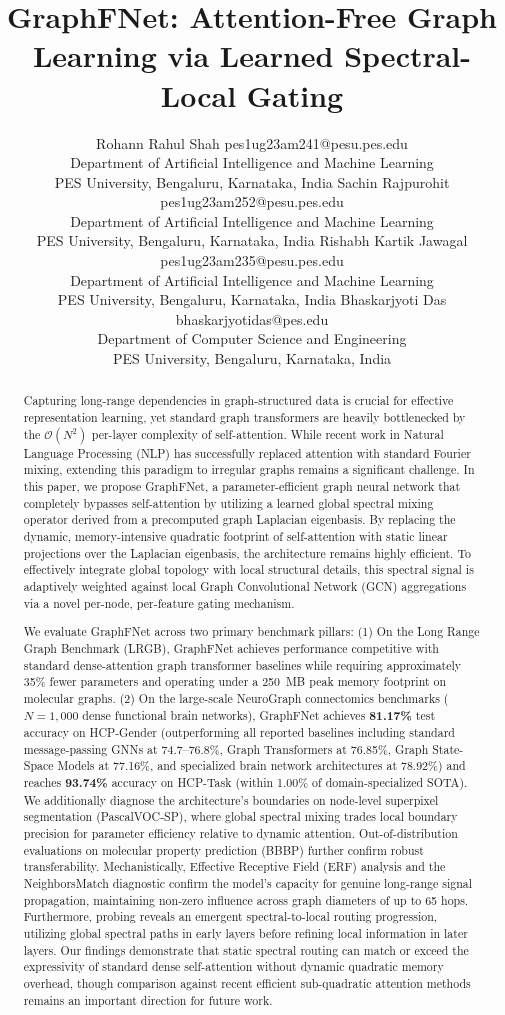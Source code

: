 \documentclass[10pt]{article}
\title{GraphFNet: Attention-Free Graph Learning via Learned Spectral-Local Gating}
\author{\name Rohann Rahul Shah \email pes1ug23am241@pesu.pes.edu \\
      \addr Department of Artificial Intelligence and Machine Learning \\
      PES University, Bengaluru, Karnataka, India
      \AND
      \name Sachin Rajpurohit \email pes1ug23am252@pesu.pes.edu \\
      \addr Department of Artificial Intelligence and Machine Learning \\
      PES University, Bengaluru, Karnataka, India
      \AND
      \name Rishabh Kartik Jawagal \email pes1ug23am235@pesu.pes.edu \\
      \addr Department of Artificial Intelligence and Machine Learning \\
      PES University, Bengaluru, Karnataka, India
      \AND
      \name Bhaskarjyoti Das \email bhaskarjyotidas@pes.edu \\
      \addr Department of Computer Science and Engineering \\
      PES University, Bengaluru, Karnataka, India}
\begin{document}
\maketitle

\begin{abstract}
Capturing long-range dependencies in graph-structured data is crucial for effective representation learning, yet standard graph transformers are heavily bottlenecked by the $\mathcal{O}(N^2)$ per-layer complexity of self-attention. While recent work in Natural Language Processing (NLP) has successfully replaced attention with standard Fourier mixing, extending this paradigm to irregular graphs remains a significant challenge. In this paper, we propose GraphFNet, a parameter-efficient graph neural network that completely bypasses self-attention by utilizing a learned global spectral mixing operator derived from a precomputed graph Laplacian eigenbasis. By replacing the dynamic, memory-intensive quadratic footprint of self-attention with static linear projections over the Laplacian eigenbasis, the architecture remains highly efficient. To effectively integrate global topology with local structural details, this spectral signal is adaptively weighted against local Graph Convolutional Network (GCN) aggregations via a novel per-node, per-feature gating mechanism.

We evaluate GraphFNet across two primary benchmark pillars: (1) On the Long Range Graph Benchmark (LRGB), GraphFNet achieves performance competitive with standard dense-attention graph transformer baselines while requiring approximately 35\% fewer parameters and operating under a 250~MB peak memory footprint on molecular graphs. (2) On the large-scale NeuroGraph connectomics benchmarks ($N=1,000$ dense functional brain networks), GraphFNet achieves \textbf{81.17\%} test accuracy on HCP-Gender (outperforming all reported baselines including standard message-passing GNNs at 74.7--76.8\%, Graph Transformers at 76.85\%, Graph State-Space Models at 77.16\%, and specialized brain network architectures at 78.92\%) and reaches \textbf{93.74\%} accuracy on HCP-Task (within 1.00\% of domain-specialized SOTA). We additionally diagnose the architecture's boundaries on node-level superpixel segmentation (PascalVOC-SP), where global spectral mixing trades local boundary precision for parameter efficiency relative to dynamic attention. Out-of-distribution evaluations on molecular property prediction (BBBP) further confirm robust transferability. Mechanistically, Effective Receptive Field (ERF) analysis and the NeighborsMatch diagnostic confirm the model's capacity for genuine long-range signal propagation, maintaining non-zero influence across graph diameters of up to 65 hops. Furthermore, probing reveals an emergent spectral-to-local routing progression, utilizing global spectral paths in early layers before refining local information in later layers. Our findings demonstrate that static spectral routing can match or exceed the expressivity of standard dense self-attention without dynamic quadratic memory overhead, though comparison against recent efficient sub-quadratic attention methods remains an important direction for future work.


\end{abstract}
\end{document}
